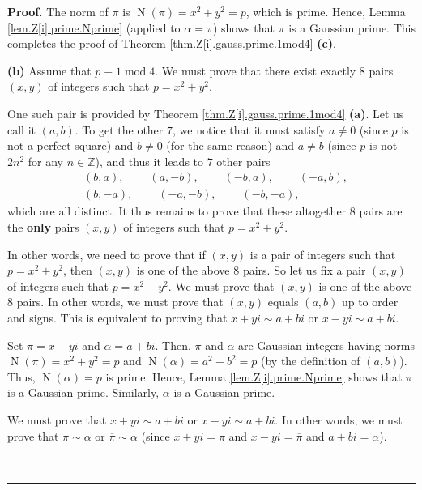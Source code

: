 \documentclass[numbers=enddot,12pt,final,onecolumn,notitlepage]{scrartcl}%
\numberwithin{exer}{subsection}
\theoremstyle{definition}
\newenvironment{proof}[1][Proof]{\noindent\textbf{#1.} }{\ \rule{0.5em}{0.5em}}
\begin{document}
\begin{proof}
The norm of $\pi$ is $\operatorname*{N}\left(  \pi\right)  =x^{2}+y^{2}=p$,
which is prime. Hence, Lemma \ref{lem.Z[i].prime.Nprime} (applied to
$\alpha=\pi$) shows that $\pi$ is a Gaussian prime. This completes the proof
of Theorem \ref{thm.Z[i].gauss.prime.1mod4} \textbf{(c)}.

\textbf{(b)} Assume that $p\equiv1\operatorname{mod}4$. We must prove that
there exist exactly $8$ pairs $\left(  x,y\right)  $ of integers such that
$p=x^{2}+y^{2}$.

One such pair is provided by Theorem \ref{thm.Z[i].gauss.prime.1mod4}
\textbf{(a)}. Let us call it $\left(  a,b\right)  $. To get the other $7$, we
notice that it must satisfy $a\neq0$ (since $p$ is not a perfect square) and
$b\neq0$ (for the same reason) and $a\neq b$ (since $p$ is not $2n^{2}$ for
any $n\in\mathbb{Z}$), and thus it leads to $7$ other pairs%
\begin{align*}
&  \left(  b,a\right)  ,\ \ \ \ \ \ \ \ \ \ \left(  a,-b\right)
,\ \ \ \ \ \ \ \ \ \ \left(  -b,a\right)  ,\ \ \ \ \ \ \ \ \ \ \left(
-a,b\right)  ,\\
&  \left(  b,-a\right)  ,\ \ \ \ \ \ \ \ \ \ \left(  -a,-b\right)
,\ \ \ \ \ \ \ \ \ \ \left(  -b,-a\right)  ,
\end{align*}
which are all distinct. It thus remains to prove that these altogether $8$
pairs are the \textbf{only} pairs $\left(  x,y\right)  $ of integers such that
$p=x^{2}+y^{2}$.

In other words, we need to prove that if $\left(  x,y\right)  $ is a pair of
integers such that $p=x^{2}+y^{2}$, then $\left(  x,y\right)  $ is one of the
above $8$ pairs. So let us fix a pair $\left(  x,y\right)  $ of integers such
that $p=x^{2}+y^{2}$. We must prove that $\left(  x,y\right)  $ is one of the
above $8$ pairs. In other words, we must prove that $\left(  x,y\right)  $
equals $\left(  a,b\right)  $ up to order and signs. This is equivalent to
proving that $x+yi\sim a+bi$ or $x-yi\sim a+bi$.

Set $\pi=x+yi$ and $\alpha=a+bi$. Then, $\pi$ and $\alpha$ are Gaussian
integers having norms $\operatorname*{N}\left(  \pi\right)  =x^{2}+y^{2}=p$
and $\operatorname*{N}\left(  \alpha\right)  =a^{2}+b^{2}=p$ (by the
definition of $\left(  a,b\right)  $). Thus, $\operatorname*{N}\left(
\alpha\right)  =p$ is prime. Hence, Lemma \ref{lem.Z[i].prime.Nprime} shows
that $\pi$ is a Gaussian prime. Similarly, $\alpha$ is a Gaussian prime.

We must prove that $x+yi\sim a+bi$ or $x-yi\sim a+bi$. In other words, we must
prove that $\pi\sim\alpha$ or $\overline{\pi}\sim\alpha$ (since $x+yi=\pi$ and
$x-yi=\overline{\pi}$ and $a+bi=\alpha$).


\end{proof}
\end{document}
